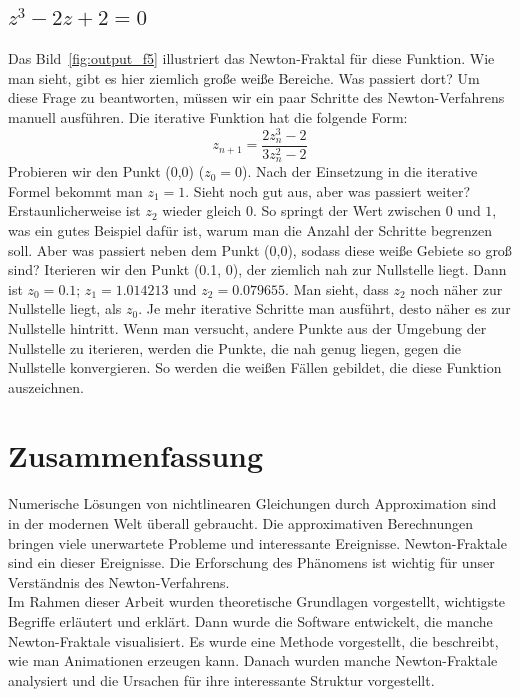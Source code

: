 \documentclass[a4paper,12pt]{llncs}
\numberwithin{equation}{section}
\begin{document}
\subsection{$z^3 - 2z + 2 = 0$}
Das Bild~\ref{fig:output_f5} illustriert das Newton-Fraktal für diese Funktion.
Wie man sieht, gibt es hier ziemlich große weiße Bereiche. 
Was passiert dort?
Um diese Frage zu beantworten, müssen wir ein paar Schritte des Newton-Verfahrens manuell ausführen.
Die iterative Funktion hat die folgende Form:
\[
z_{n+1} = \frac{2z_n^3-2}{3z_n^2-2}
\]
Probieren wir den Punkt (0,0) ($z_0 = 0$).
Nach der Einsetzung in die iterative Formel bekommt man $z_1 = 1$.
Sieht noch gut aus, aber was passiert weiter?
Erstaunlicherweise ist $z_2$ wieder gleich $0$.
So springt der Wert zwischen $0$ und $1$, was ein gutes Beispiel dafür ist, warum man die Anzahl der Schritte begrenzen soll.
Aber was passiert neben dem Punkt (0,0), sodass diese weiße Gebiete so groß sind?
Iterieren wir den Punkt (0.1, 0), der ziemlich nah zur Nullstelle liegt.
Dann ist $z_0=0.1$; $z_1= 1.014213$ und $z_2= 0.079655$.
Man sieht, dass $z_2$ noch näher zur Nullstelle liegt, als $z_0$.
Je mehr iterative Schritte man ausführt, desto näher es zur Nullstelle hintritt.
Wenn man versucht, andere Punkte aus der Umgebung der Nullstelle zu iterieren, werden die Punkte, die nah genug liegen, gegen die Nullstelle konvergieren.
So werden die weißen Fällen gebildet, die diese Funktion auszeichnen.

\section{Zusammenfassung}
Numerische Lösungen von nichtlinearen Gleichungen durch Approximation sind in der modernen Welt überall gebraucht.
Die approximativen Berechnungen bringen viele unerwartete Probleme und interessante Ereignisse.
Newton-Fraktale sind ein dieser Ereignisse. 
Die Erforschung des Phänomens ist wichtig für unser Verständnis des Newton-Verfahrens.\\
Im Rahmen dieser Arbeit wurden theoretische Grundlagen vorgestellt, wichtigste Begriffe erläutert und erklärt.
Dann wurde die Software entwickelt, die manche Newton-Fraktale visualisiert.
Es wurde eine Methode vorgestellt, die beschreibt, wie man Animationen erzeugen kann.
Danach wurden manche Newton-Fraktale analysiert und die Ursachen für ihre interessante Struktur vorgestellt.
\newpage

 

\end{document}
